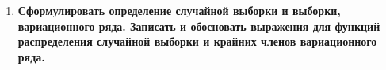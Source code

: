 \documentclass[12pt]{report}
\begin{document}
\begin{enumerate}
\begin{figure}[!h]
	\end{figure}
	\begin{figure}[!h]
	\end{figure}
	\clearpage
	\begin{figure}[!h]
	\end{figure}
	\item \textbf{Сформулировать определение случайной выборки и выборки, вариационного ряда. Записать
		и обосновать выражения для функций распределения случайной выборки и крайних членов
		вариационного ряда.}
	\begin{figure}[!h]
	\end{figure}
	\begin{figure}[!h]

\end{figure}
\end{enumerate}
\end{document}
